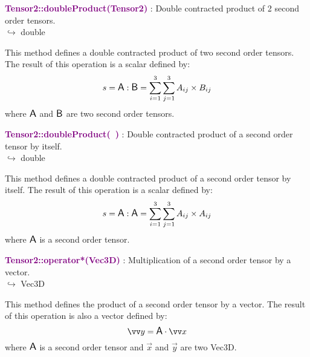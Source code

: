 \textcolor{purple}{\textbf{Tensor2::doubleProduct(Tensor2)}}\label{Tensor2::doubleProduct(Tensor2)} : Double contracted product of 2 second order tensors.\\ \hspace*{5mm}$\hookrightarrow$ double

This method defines a double contracted product of two second order tensors.
The result of this operation is a scalar defined by:
\begin{equation*}
s = \mbox{\large\ensuremath{\mathsf{A}}} : \mbox{\large\ensuremath{\mathsf{B}}} = \sum_{i=1}^{3} \sum_{j=1}^{3} A_{ij}\times B_{ij}
\end{equation*}
where $\mbox{\large\ensuremath{\mathsf{A}}}$ and $\mbox{\large\ensuremath{\mathsf{B}}}$ are two second order tensors.

\textcolor{purple}{\textbf{Tensor2::doubleProduct(~)}}\label{Tensor2::doubleProduct()} : Double contracted product of a second order tensor by itself.\\ \hspace*{5mm}$\hookrightarrow$ double

This method defines a double contracted product of a second order tensor by itself.
The result of this operation is a scalar defined by:
\begin{equation*}
s = \mbox{\large\ensuremath{\mathsf{A}}} : \mbox{\large\ensuremath{\mathsf{A}}} = \sum_{i=1}^{3} \sum_{j=1}^{3} A_{ij}\times A_{ij}
\end{equation*}
where $\mbox{\large\ensuremath{\mathsf{A}}}$ is a second order tensor.

\textcolor{purple}{\textbf{Tensor2::operator*(Vec3D)}}\label{Tensor2::operator*(Vec3D)} : Multiplication of a second order tensor by a vector.\\ \hspace*{5mm}$\hookrightarrow$ Vec3D

  This method defines the product of a second order tensor by a vector.
  The result of this operation is also a vector defined by:
\begin{equation*}
\overrightarrow{y} = \A \cdot \overrightarrow{x}
\end{equation*}
where $\mbox{\large\ensuremath{\mathsf{A}}}$ is a second order tensor and $\overrightarrow{x}$ and $\overrightarrow{y}$ are two Vec3D.

